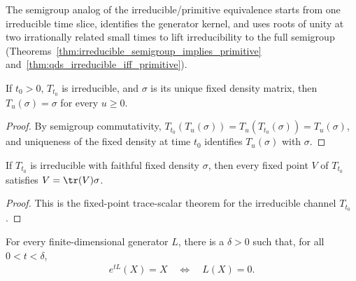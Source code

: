\begin{remark}\leanok
    The semigroup analog of the irreducible/primitive equivalence
    starts from one irreducible time slice, identifies the generator kernel,
    and uses roots of unity at two irrationally related small times to lift
    irreducibility to the full semigroup
    (Theorems~\ref{thm:irreducible_semigroup_implies_primitive}
    and~\ref{thm:qds_irreducible_iff_primitive}).
\end{remark}

\begin{theorem}
    \label{thm:fixed_density_fixed_for_all_times_ch12}
    \leanok
    If $t_0>0$, $T_{t_0}$ is irreducible, and $\sigma$ is its unique fixed density
    matrix, then $T_u(\sigma)=\sigma$ for every $u\ge0$.
\end{theorem}

\begin{proof}
    \leanok
    By semigroup commutativity,
    $T_{t_0}(T_u(\sigma))=T_u(T_{t_0}(\sigma))=T_u(\sigma)$,
    and uniqueness of the fixed density at time $t_0$ identifies
    $T_u(\sigma)$ with $\sigma$.
\end{proof}

\begin{theorem}
    \label{thm:fixedPoint_eq_trace_smul_at_irreducible_time_ch12}
    \leanok
    If $T_{t_0}$ is irreducible with faithful fixed density $\sigma$, then every fixed point
    $V$ of $T_{t_0}$ satisfies $V=\tr(V)\sigma$.
\end{theorem}

\begin{proof}
    \leanok
    This is the fixed-point trace-scalar theorem for the irreducible channel $T_{t_0}$.
\end{proof}

\begin{theorem}
    \label{thm:small_time_fixed_space_eq_generator_kernel_ch12}
    \leanok
    For every finite-dimensional generator $L$, there is a $\delta>0$ such
    that, for all $0<t<\delta$,
    \begin{align}
        e^{tL}(X)=X \quad\Longleftrightarrow\quad L(X)=0.
    \end{align}
\end{theorem}

